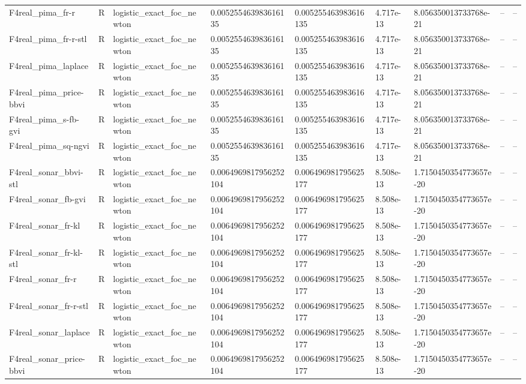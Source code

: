 \begin{tabular}{lllllllll}
F4real\_pima\_fr-r & R & logistic\_exact\_foc\_newton & 0.005255463983616135 & 0.005255463983616135 & 4.717e-13 & 8.056350013733768e-21 & -- & -- \\
F4real\_pima\_fr-r-stl & R & logistic\_exact\_foc\_newton & 0.005255463983616135 & 0.005255463983616135 & 4.717e-13 & 8.056350013733768e-21 & -- & -- \\
F4real\_pima\_laplace & R & logistic\_exact\_foc\_newton & 0.005255463983616135 & 0.005255463983616135 & 4.717e-13 & 8.056350013733768e-21 & -- & -- \\
F4real\_pima\_price-bbvi & R & logistic\_exact\_foc\_newton & 0.005255463983616135 & 0.005255463983616135 & 4.717e-13 & 8.056350013733768e-21 & -- & -- \\
F4real\_pima\_s-fb-gvi & R & logistic\_exact\_foc\_newton & 0.005255463983616135 & 0.005255463983616135 & 4.717e-13 & 8.056350013733768e-21 & -- & -- \\
F4real\_pima\_sq-ngvi & R & logistic\_exact\_foc\_newton & 0.005255463983616135 & 0.005255463983616135 & 4.717e-13 & 8.056350013733768e-21 & -- & -- \\
F4real\_sonar\_bbvi-stl & R & logistic\_exact\_foc\_newton & 0.0064969817956252104 & 0.006496981795625177 & 8.508e-13 & 1.7150450354773657e-20 & -- & -- \\
F4real\_sonar\_fb-gvi & R & logistic\_exact\_foc\_newton & 0.0064969817956252104 & 0.006496981795625177 & 8.508e-13 & 1.7150450354773657e-20 & -- & -- \\
F4real\_sonar\_fr-kl & R & logistic\_exact\_foc\_newton & 0.0064969817956252104 & 0.006496981795625177 & 8.508e-13 & 1.7150450354773657e-20 & -- & -- \\
F4real\_sonar\_fr-kl-stl & R & logistic\_exact\_foc\_newton & 0.0064969817956252104 & 0.006496981795625177 & 8.508e-13 & 1.7150450354773657e-20 & -- & -- \\
F4real\_sonar\_fr-r & R & logistic\_exact\_foc\_newton & 0.0064969817956252104 & 0.006496981795625177 & 8.508e-13 & 1.7150450354773657e-20 & -- & -- \\
F4real\_sonar\_fr-r-stl & R & logistic\_exact\_foc\_newton & 0.0064969817956252104 & 0.006496981795625177 & 8.508e-13 & 1.7150450354773657e-20 & -- & -- \\
F4real\_sonar\_laplace & R & logistic\_exact\_foc\_newton & 0.0064969817956252104 & 0.006496981795625177 & 8.508e-13 & 1.7150450354773657e-20 & -- & -- \\
F4real\_sonar\_price-bbvi & R & logistic\_exact\_foc\_newton & 0.0064969817956252104 & 0.006496981795625177 & 8.508e-13 & 1.7150450354773657e-20 & -- & -- \\

\end{tabular}
